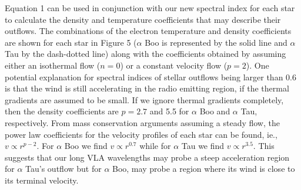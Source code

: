 \documentclass[iop]{emulateapj}
\begin{document}
Equation 1 can be used in conjunction with our new spectral index for each star to calculate the density and temperature coefficients that may describe their outflows. The combinations of the electron temperature and density coefficients are shown for each star in Figure 5 ($\alpha$ Boo is represented by the solid line and $\alpha$ Tau by the dash-dotted line) along with the coefficients obtained by assuming either an isothermal flow ($n=0$) or a constant velocity flow ($p=2$). One potential explanation for spectral indices of stellar outflows being larger than 0.6 is that the wind is still accelerating in the radio emitting region, if the thermal gradients are assumed to be small. If we ignore thermal gradients completely, then the density coefficients are $p  =2.7$ and 5.5 for $\alpha$ Boo and $\alpha$ Tau, respectively. From mass conservation arguments assuming a steady flow, the power law coefficients for the velocity profiles of each star can be found, ie., $v \propto r^{p-2}$. For $\alpha$ Boo we find $v \propto r^{0.7}$ while for $\alpha$ Tau we find $v \propto r^{3.5}$. This suggests that our long VLA wavelengths may probe a steep acceleration region for $\alpha$ Tau's outflow but for $\alpha$ Boo, may probe a region where its wind is close to its terminal velocity. 
\end{document}
